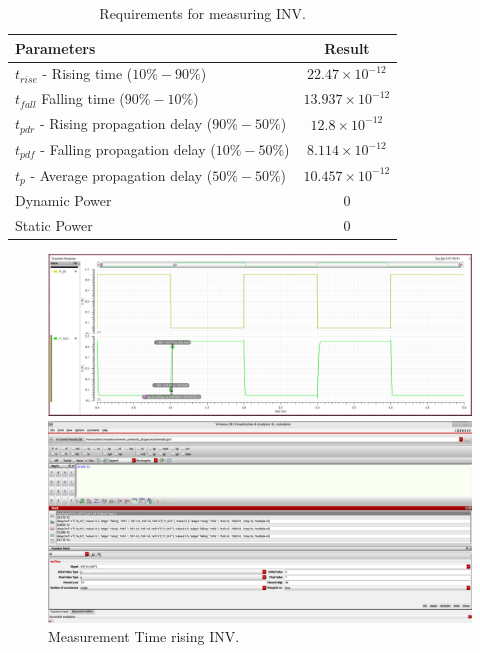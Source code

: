 \begin{table}[H]
	\centering
	\begin{tabular}{|p{.5\linewidth}|c|}
		\hline
		Parameters & Result\\
		\hline
		$t_{rise}$ - Rising time ($10\% - 90\%$) & $22.47\times10^{-12}$\\
		\hline
		$t_{fall}$  Falling time ($90\% - 10\%$) & $13.937\times10^{-12}$\\
		\hline
		$t_{pdr}$ - Rising propagation delay ($90\% - 50\%$) & $12.8\times10^{-12}$\\
		\hline
		$t_{pdf}$ - Falling propagation delay ($10\% - 50\%$) & $8.114\times10^{-12}$\\
		\hline
		$t_{p}$ - Average propagation delay ($50\% - 50\%$) & $10.457\times10^{-12}$\\
		\hline
		Dynamic Power & $0$\\
		\hline
		Static Power & $0$\\
		\hline
	\end{tabular}
	\caption{Requirements for measuring INV.}
	\label{f_measuring INV}
\end{table}

\begin{figure}[H]
	\begin{minipage}{0.5\linewidth}
		\includegraphics[width=\linewidth]{section/EX1/INV/EX1_INV_Tr_Waveform.png}
	\end{minipage}
	\begin{minipage}{0.5\linewidth}
		\includegraphics[width=\linewidth]{section/EX1/INV/EX1_INV_Tr_Cal.png}
	\end{minipage}
	\caption{Measurement Time rising INV.}
\end{figure}

